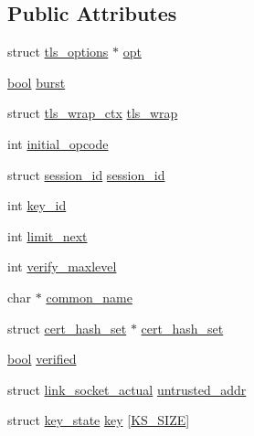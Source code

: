 \subsection*{Public Attributes}
\begin{DoxyCompactItemize}
\item 
struct \hyperlink{structtls__options}{tls\+\_\+options} $\ast$ \hyperlink{structtls__session_a748abaa327fa0bd6a8c23224a06f3a56}{opt}
\item 
\hyperlink{automatic_8c_abb452686968e48b67397da5f97445f5b}{bool} \hyperlink{structtls__session_ad3ba3d680dfcedd825add2385c0b0af9}{burst}
\item 
struct \hyperlink{structtls__wrap__ctx}{tls\+\_\+wrap\+\_\+ctx} \hyperlink{structtls__session_a8c6ee7b38824295f77feaeb35ac8e673}{tls\+\_\+wrap}
\item 
int \hyperlink{structtls__session_add6a01262e483abdb2cf4d6315741e6b}{initial\+\_\+opcode}
\item 
struct \hyperlink{structsession__id}{session\+\_\+id} \hyperlink{structtls__session_af71f7593007875222fc1bfbeeaf5d4fc}{session\+\_\+id}
\item 
int \hyperlink{structtls__session_a1255432a61acbfe1b94c15146e9698e0}{key\+\_\+id}
\item 
int \hyperlink{structtls__session_a45df56ce77e3c62ce88d6e3cdd743aab}{limit\+\_\+next}
\item 
int \hyperlink{structtls__session_a9b8993f2c4525caa43cb88b00a20bada}{verify\+\_\+maxlevel}
\item 
char $\ast$ \hyperlink{structtls__session_a83a9f4e9d176b93ca7575ff7e3e30c07}{common\+\_\+name}
\item 
struct \hyperlink{structcert__hash__set}{cert\+\_\+hash\+\_\+set} $\ast$ \hyperlink{structtls__session_a344489ec127b5681fe3cf90e72b85466}{cert\+\_\+hash\+\_\+set}
\item 
\hyperlink{automatic_8c_abb452686968e48b67397da5f97445f5b}{bool} \hyperlink{structtls__session_a5409c3f4b00fb0bbea119d3431f3ec8f}{verified}
\item 
struct \hyperlink{structlink__socket__actual}{link\+\_\+socket\+\_\+actual} \hyperlink{structtls__session_aa9bbd0222f1023fa627bc6736cc9135c}{untrusted\+\_\+addr}
\item 
struct \hyperlink{structkey__state}{key\+\_\+state} \hyperlink{structtls__session_a1de4672c1233dd4887122a909b10c314}{key} \mbox{[}\hyperlink{group__control__processor_ga136f3095237ae23358c30581753e4178}{K\+S\+\_\+\+S\+I\+Z\+E}\mbox{]}
\end{DoxyCompactItemize}


